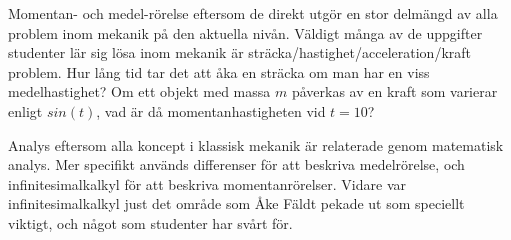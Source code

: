 \begin{binge}
\begin{draft}
  Momentan- och medel-rörelse eftersom de direkt utgör en stor delmängd
  av alla problem inom mekanik på den aktuella nivån. Väldigt många av
  de uppgifter studenter lär sig lösa inom mekanik är
  sträcka/hastighet/acceleration/kraft problem. Hur lång tid tar det att åka en
  sträcka om man har en viss medelhastighet? Om ett objekt med massa $m$
  påverkas av en kraft som varierar enligt $sin(t)$, vad är då
  momentanhastigheten vid $t=10$?

  Analys eftersom alla koncept i klassisk mekanik är relaterade genom
  matematisk analys. Mer specifikt används differenser för att beskriva
  medelrörelse, och infinitesimalkalkyl för att beskriva
  momentanrörelser. Vidare var infinitesimalkalkyl just det område som
  Åke Fäldt pekade ut som speciellt viktigt, och något som studenter har
  svårt för.
\end{draft}



\end{binge}

